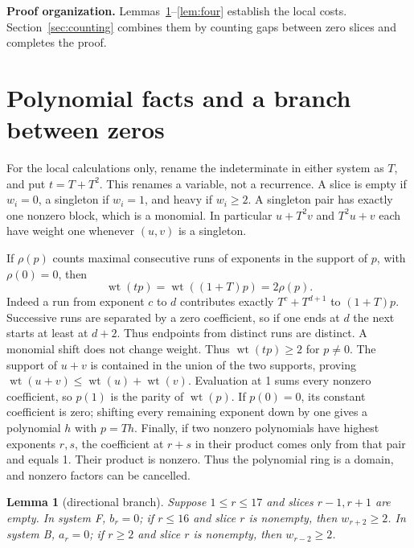 \documentclass{article}
\newtheorem{lemma}{Lemma}
\DeclareMathOperator{\wt}{wt}
\begin{document}
\textbf{Proof organization.} Lemmas~\ref{lem:branch}--\ref{lem:four} establish the local costs.
Section~\ref{sec:counting} combines them by counting gaps between zero slices and completes the
proof.

\section{Polynomial facts and a branch between zeros}\label{sec:polynomial}

For the local calculations only, rename the indeterminate in either system as \(T\), and put
\(t = T + T^2\). This renames a variable, not a recurrence. A slice is empty if \(w_i = 0\), a
singleton if \(w_i = 1\), and heavy if \(w_i \ge 2\). A singleton pair has exactly one nonzero
block, which is a monomial. In particular \(u + T^2 v\) and \(T^2 u + v\) each have weight one
whenever \((u,v)\) is a singleton.

If \(\rho(p)\) counts maximal consecutive runs of exponents in the support of \(p\), with
\(\rho(0) = 0\), then
\begin{equation}\label{eq:runs}
  \wt(tp) = \wt((1 + T)p) = 2\rho(p).
\end{equation}
Indeed a run from exponent \(c\) to \(d\) contributes exactly \(T^c + T^{d+1}\) to \((1 + T)p\).
Successive runs are separated by a zero coefficient, so if one ends at \(d\) the next starts at
least at \(d + 2\). Thus endpoints from distinct runs are distinct. A monomial shift does not
change weight. Thus \(\wt(tp) \ge 2\) for \(p \ne 0\). The support of \(u + v\) is contained in
the union of the two supports, proving \(\wt(u + v) \le \wt(u) + \wt(v)\). Evaluation at 1 sums
every nonzero coefficient, so \(p(1)\) is the parity of \(\wt(p)\). If \(p(0) = 0\), its constant
coefficient is zero; shifting every remaining exponent down by one gives a polynomial \(h\) with
\(p = Th\). Finally, if two nonzero polynomials have highest exponents \(r, s\), the coefficient
at \(r + s\) in their product comes only from that pair and equals 1. Their product is nonzero.
Thus the polynomial ring is a domain, and nonzero factors can be cancelled.

\begin{lemma}[directional branch]\label{lem:branch}
  Suppose \(1 \le r \le 17\) and slices \(r - 1, r + 1\) are empty. In system F, \(b_r = 0\); if
  \(r \le 16\) and slice \(r\) is nonempty, then \(w_{r+2} \ge 2\). In system B, \(a_r = 0\); if
  \(r \ge 2\) and slice \(r\) is nonempty, then \(w_{r-2} \ge 2\).
\end{lemma}
\end{document}
